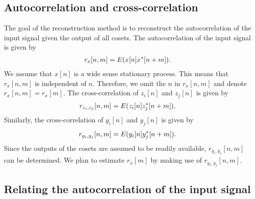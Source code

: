 \documentclass[a4paper, openany, oneside]{memoir}
\begin{document}
\subsection{Autocorrelation and cross-correlation}
The goal of the reconstruction method is to reconstruct the autocorrelation of the input signal given the output of all cosets. The autocorrelation of the input signal is given by
\begin{align*}
    r_x[n,m] = E(x[n]x^*[n+m]).
\end{align*}
We assume that $x[n]$ is a wide sense stationary process. This means that $r_x[n,m]$ is independent of $n$. Therefore, we omit the $n$ in $r_x[n,m]$ and denote $r_x[n,m]=r_x[m]$. The cross-correlation of $z_i[n]$ and $z_j[n]$ is given by
\begin{align*}
    r_{z_i,z_j}[n,m]=E(z_i[n]z^*_j[n+m]).
\end{align*}
Similarly, the cross-correlation of $y_i[n]$ and $y_j[n]$ is given by
\begin{align*}
    r_{y_i,y_j}[n,m]=E(y_i[n]y^*_j[n+m]).
\end{align*}
Since the outputs of the cosets are assumed to be readily available, $r_{y_i,y_j}[n,m]$ can be determined. We plan to estimate $r_x[m]$ by making use of $r_{y_i,y_j}[n,m]$.

\subsection{Relating the autocorrelation of the input signal}
\end{document}
